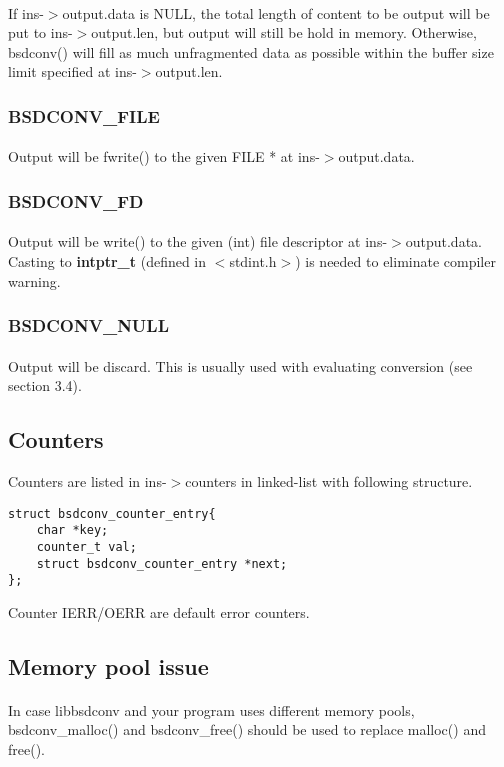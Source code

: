 \documentclass{article}
\begin{document}
				\paragraph{}
				If ins-$>$output.data is NULL, the total length of content to be output will be put to ins-$>$output.len, but output will still be hold in memory. Otherwise, bsdconv() will fill as much unfragmented data as possible within the buffer size limit specified at ins-$>$output.len.
			\subsubsection{BSDCONV\_FILE}
				\paragraph{}
				Output will be fwrite() to the given FILE * at ins-$>$output.data.
			\subsubsection{BSDCONV\_FD}
				\paragraph{}
				Output will be write() to the given (int) file descriptor at ins-$>$output.data. Casting to \textbf{intptr\_t} (defined in $<$stdint.h$>$) is needed to eliminate compiler warning.
			\subsubsection{BSDCONV\_NULL}
				\paragraph{}
				Output will be discard. This is usually used with evaluating conversion (see section 3.4).

		\subsection{Counters}
			Counters are listed in ins-$>$counters in linked-list with following structure.
			\begin{lstlisting}
struct bsdconv_counter_entry{
	char *key;
	counter_t val;
	struct bsdconv_counter_entry *next;
};
			\end{lstlisting}
			Counter IERR/OERR are default error counters.
			
		\subsection{Memory pool issue}
			\paragraph{}
			In case libbsdconv and your program uses different memory pools, bsdconv\_malloc() and bsdconv\_free() should be used to replace malloc() and free().
\end{document}
